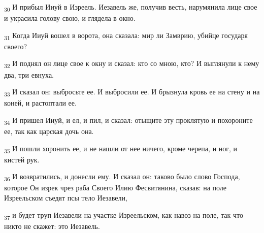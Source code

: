 \begin{tcolorbox}
\textsubscript{30} И прибыл Ииуй в Изреель. Иезавель же, получив весть, нарумянила лице свое и украсила голову свою, и глядела в окно.
\end{tcolorbox}
\begin{tcolorbox}
\textsubscript{31} Когда Ииуй вошел в ворота, она сказала: мир ли Замврию, убийце государя своего?
\end{tcolorbox}
\begin{tcolorbox}
\textsubscript{32} И поднял он лице свое к окну и сказал: кто со мною, кто? И выглянули к нему два, три евнуха.
\end{tcolorbox}
\begin{tcolorbox}
\textsubscript{33} И сказал он: выбросьте ее. И выбросили ее. И брызнула кровь ее на стену и на коней, и растоптали ее.
\end{tcolorbox}
\begin{tcolorbox}
\textsubscript{34} И пришел Ииуй, и ел, и пил, и сказал: отыщите эту проклятую и похороните ее, так как царская дочь она.
\end{tcolorbox}
\begin{tcolorbox}
\textsubscript{35} И пошли хоронить ее, и не нашли от нее ничего, кроме черепа, и ног, и кистей рук.
\end{tcolorbox}
\begin{tcolorbox}
\textsubscript{36} И возвратились, и донесли ему. И сказал он: таково было слово Господа, которое Он изрек чрез раба Своего Илию Фесвитянина, сказав: на поле Изреельском съедят псы тело Иезавели,
\end{tcolorbox}
\begin{tcolorbox}
\textsubscript{37} и будет труп Иезавели на участке Изреельском, как навоз на поле, так что никто не скажет: это Иезавель.
\end{tcolorbox}
